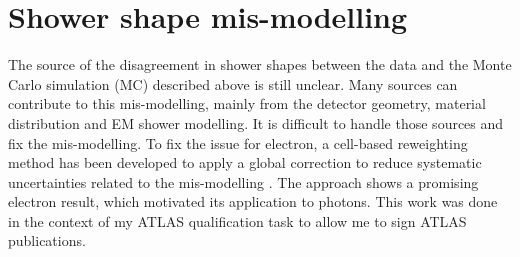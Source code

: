 \section{Shower shape mis-modelling}
\label{gamma:ss}
The source of the disagreement in shower shapes between the data and the Monte Carlo simulation (MC) described above is still unclear. Many sources can contribute to this mis-modelling, mainly from the detector geometry, material distribution and EM shower modelling. It is difficult to handle those sources and fix the mis-modelling. To fix the issue for electron, a cell-based reweighting method has been developed to apply a global correction to reduce systematic uncertainties related to the mis-modelling \cite{xu, khandoga}. The approach shows a promising electron result, which motivated its application to photons. This work was done in the context of my ATLAS qualification task to allow me to sign ATLAS publications.

